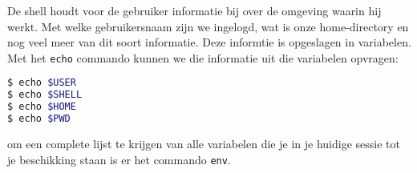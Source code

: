 De shell houdt voor de gebruiker informatie bij over de omgeving waarin hij werkt. Met welke gebruikersnaam zijn we ingelogd, wat is onze home-directory en nog veel meer van dit soort informatie. Deze informtie is opgeslagen in variabelen. Met het \texttt{echo} commando kunnen we die informatie uit die variabelen opvragen:
\begin{lstlisting}[language=bash]
$ echo $USER
$ echo $SHELL
$ echo $HOME
$ echo $PWD
\end{lstlisting}
om een complete lijst te krijgen van alle variabelen die je in je huidige sessie tot je beschikking staan is er het commando \texttt{env}.

